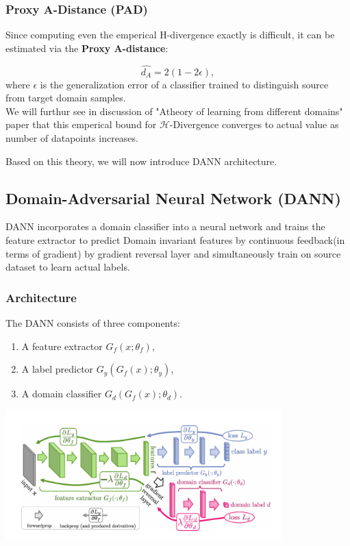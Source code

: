 \documentclass{article}
\begin{document}
\subsubsection{Proxy A-Distance (PAD)}

Since computing even the emperical H-divergence exactly is difficult, it can be estimated via the \textbf{Proxy A-distance}:

\begin{equation}
\hat{d_A} = 2(1 - 2\epsilon),
\end{equation}
where \( \epsilon \) is the generalization error of a classifier trained to distinguish source from target domain samples.
\\
We will furthur see in discussion of "Atheory of learning from different domains" paper that this emperical bound for $\mathcal{H}$-Divergence converges to actual value as number of datapoints increases.

Based on this theory, we will now introduce DANN architecture.



\subsection{Domain-Adversarial Neural Network (DANN)}

DANN incorporates a domain classifier into a neural network and trains the feature extractor to predict Domain invariant features by continuous feedback(in terms of gradient) by gradient reversal layer and simultaneously train on source dataset to learn actual labels.

\subsubsection{Architecture}

The DANN consists of three components:
\begin{enumerate}[noitemsep]
    \item A feature extractor \( G_f(x; \theta_f) \),
    \item A label predictor \( G_y(G_f(x); \theta_y) \),
    \item A domain classifier \( G_d(G_f(x); \theta_d) \).
\end{enumerate}

\begin{center}
\includegraphics[width=0.8\textwidth]{DANN/DANN_img.png}
\end{center}
\end{document}
